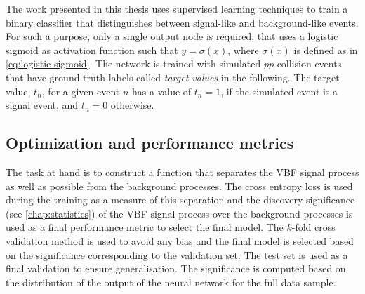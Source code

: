 The work presented in this thesis uses supervised learning techniques to train a binary classifier that distinguishes between signal-like and background-like events. 
For such a purpose, only a single output node is required, that uses a logistic sigmoid as activation function such that $y = \sigma(x)$, where $\sigma(x)$ is defined as in \cref{eq:logistic-sigmoid}.
The network is trained with simulated $pp$ collision events that have ground-truth labels called \emph{target values} in the following. The target value, $t_n$, for a given event $n$ has a value of $t_n = 1$, if the simulated event is a signal event, and $t_n = 0$ otherwise.


\subsection{Optimization and performance metrics}
The task at hand is to construct a function that separates the VBF signal process as well as possible from the background processes.
The cross entropy loss is used during the training as a measure of this separation and the discovery significance (see \cref{chap:statistics}) of the VBF signal process over the background processes is used as a final performance metric to select the final model.
The $k$-fold cross validation method is used to avoid any bias and the final model is selected based on the significance corresponding to the validation set. The test set is used as a final validation to ensure generalisation. 
The significance is computed based on the distribution of the output of the neural network for the full data sample. 


